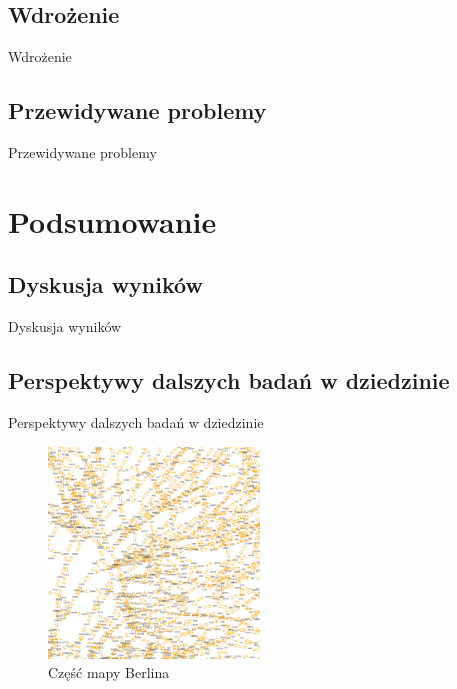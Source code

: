 \documentclass{beamer}
\begin{document}
\subsection{Wdrożenie}
\begin{frame}{Wdrożenie} 

\end{frame}


\subsection{Przewidywane problemy}
\begin{frame}{Przewidywane problemy} 

\end{frame}


\section{Podsumowanie}

\subsection{Dyskusja wyników}
\begin{frame}{Dyskusja wyników} 

\end{frame}


\subsection{Perspektywy dalszych badań w dziedzinie}
\begin{frame}{Perspektywy dalszych badań w dziedzinie} 

\begin{figure}[h!]
\includegraphics[width=0.50\textwidth]{img/berlin}
\caption{Część mapy Berlina}
\end{figure}

\end{frame}
\end{document}
